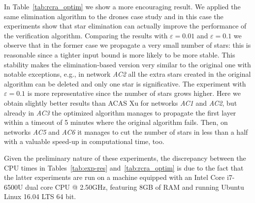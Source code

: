 In Table~\ref{tab:rcra_optim} we show a more encouraging result. We applied the same
elimination algorithm to the drones case study and in this case the experiments
show that star elimination can actually improve the performance of the verification
algorithm. Comparing the results with $\varepsilon = 0.01$ and $\varepsilon = 0.1$ we
observe that in the former case we propagate a very small number of stars: this is
reasonable since a tighter input bound is more likely to be more stable. This 
stability makes the elimination-based version very similar to the original one 
with notable exceptions, e.g., in network \textit{AC2} all the extra stars created 
in the original algorithm can be deleted and only one star is significative. 
The experiment with $\varepsilon = 0.1$ is more representative since the number of 
stars grows higher. Here we obtain slightly better results than ACAS Xu for networks 
\textit{AC1} and \textit{AC2}, but already in \textit{AC3} the optimized algorithm 
manages to propagate the first layer within a timeout of 5 minutes where the original 
algorithm fails. Then, on networks \textit{AC5} and \textit{AC6} it manages to cut 
the number of stars in less than a half with a valuable speed-up in computational time, 
too.

Given the preliminary nature of these experiments, the discrepancy between the CPU
times in Tables~\ref{tab:exp-res} and~\ref{tab:rcra_optim} is due to the fact that
the latter experiments are run on a machine equipped with an Intel\textregistered  
\hspace{1pt} Core\texttrademark \hspace{1pt} i7-6500U dual core CPU @ 2.50GHz, 
featuring 8GB of RAM and running Ubuntu Linux 16.04 LTS 64 bit.

